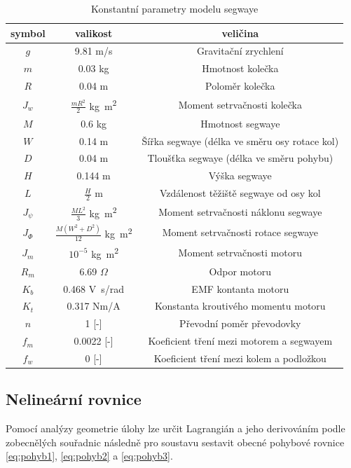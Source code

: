 \documentclass[conference]{IEEEtran}
\begin{document}
\begin{table}[htbp]
    \centering
    \begin{tabular}[t]{|c|c|c|}
        \hline
        symbol & valikost & veličina \\\hline
        $ g $ & 9.81 \si{m/s} & Gravitační zrychlení \\\hline
        $ m $ & 0.03 \si{kg} & Hmotnost kolečka \\\hline
        $ R $ & 0.04 \si{m }& Poloměr kolečka \\\hline
        $ J_w $ & $\frac{mR^2}{2}$ \si{kg . m^2} & Moment setrvačnosti kolečka \\\hline
        $ M $ & 0.6   \si{kg} & Hmotnost segwaye \\\hline
        $ W $ & 0.14  \si{ m} & Šířka segwaye (délka ve směru osy rotace kol) \\\hline
        $ D $ & 0.04  \si{ m} & Tloušťka segwaye (délka ve směru pohybu) \\\hline
        $ H $ & 0.144 \si{m }& Výška  segwaye \\\hline
        $ L $ & $\frac{H}{2}$ \si{m} & Vzdálenost těžiště segwaye od osy kol \\\hline
        $ J_\psi $ & $\frac{ML^2}{3}$ \si{kg . m^2} & Moment setrvačnosti náklonu segwaye\\\hline
        $ J_\varPhi $ & $\frac{M(W^2 + D^2)}{12}$ \si{kg . m^2} & Moment setrvačnosti rotace segwaye \\\hline
        $ J_m $ & $10^{-5}$ \si{kg . m^2} & Moment setrvačnosti motoru \\\hline
        $ R_m $ & 6.69 $\Omega$ & Odpor motoru \\\hline
        $ K_b $ & 0.468 \si{V.s/rad} & EMF kontanta motoru \\\hline
        $ K_t $ & 0.317 \si{Nm/A} & Konstanta kroutivého momentu motoru \\\hline
        $ n $ & 1 [-] & Převodní poměr převodovky \\\hline
        $ f_m $ & 0.0022 [-] & Koeficient tření mezi motorem a segwayem \\\hline
        $ f_w $ & 0 [-] & Koeficient tření mezi kolem a podložkou \\\hline
        
    \end{tabular}
    \caption{Konstantní parametry modelu segwaye}
    \label{tab:konstanty}
\end{table}

\subsection{Nelineární rovnice}
Pomocí analýzy geometrie úlohy lze určit Lagrangián a jeho derivováním podle zobecnělých souřadnic 
následně pro soustavu sestavit obecné pohybové rovnice \eqref{eq:pohyb1}, \eqref{eq:pohyb2} a \eqref{eq:pohyb3}.
\end{document}
